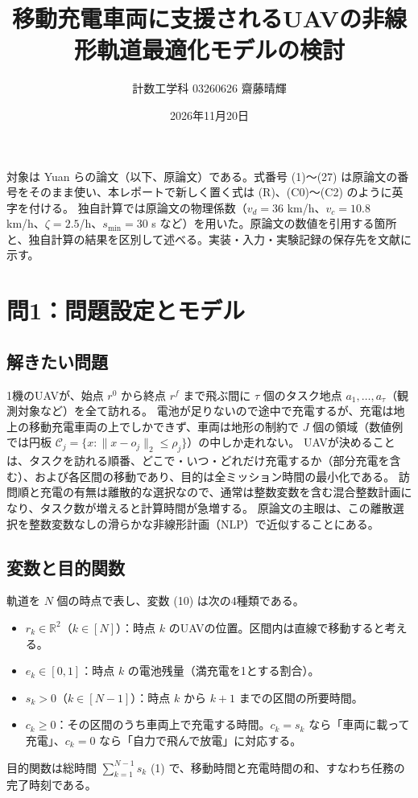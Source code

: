 \documentclass[uplatex,dvipdfmx,a4paper,11pt,jafont=haranoaji]{bxjsarticle}
\newcommand{\answerpart}[1]{\par\Needspace{6\baselineskip}\subsection*{#1}}
\newcommand{\norm}[1]{\lVert #1\rVert_2}
\begin{document}
\title{移動充電車両に支援されるUAVの非線形軌道最適化モデルの検討}
\author{計数工学科 03260626 齋藤晴輝}
\date{2026年11月20日}
\maketitle
\thispagestyle{fancy}

対象は Yuan ら\cite{yuan}の論文（以下、原論文）である。式番号 (1)〜(27) は原論文の番号をそのまま使い、本レポートで新しく置く式は (R)、(C0)〜(C2) のように英字を付ける。
独自計算では原論文の物理係数（$v_d=36$ km/h、$v_c=10.8$ km/h、$\zeta=2.5$/h、$s_{\min}=30$ s など）を用いた。原論文の数値を引用する箇所と、独自計算の結果を区別して述べる。実装・入力・実験記録の保存先を文献\cite{repo}に示す。

\section{問1：問題設定とモデル}

\answerpart{解きたい問題}
1機のUAVが、始点 $r^0$ から終点 $r^f$ まで飛ぶ間に $\tau$ 個のタスク地点 $a_1,\dots,a_\tau$（観測対象など）を全て訪れる。
電池が足りないので途中で充電するが、充電は地上の移動充電車両の上でしかできず、車両は地形の制約で $J$ 個の領域（数値例では円板 $\mathcal C_j=\{x:\norm{x-o_j}\le\rho_j\}$）の中しか走れない。
UAVが決めることは、タスクを訪れる順番、どこで・いつ・どれだけ充電するか（部分充電を含む）、および各区間の移動であり、目的は全ミッション時間の最小化である。
訪問順と充電の有無は離散的な選択なので、通常は整数変数を含む混合整数計画になり、タスク数が増えると計算時間が急増する。
原論文の主眼は、この離散選択を整数変数なしの滑らかな非線形計画（NLP）で近似することにある。

\answerpart{変数と目的関数}
軌道を $N$ 個の時点で表し、変数 (10) は次の4種類である。
\begin{itemize}
  \item $r_k\in\mathbb R^2$（$k\in[N]$）：時点 $k$ のUAVの位置。区間内は直線で移動すると考える。
  \item $e_k\in[0,1]$：時点 $k$ の電池残量（満充電を1とする割合）。
  \item $s_k>0$（$k\in[N-1]$）：時点 $k$ から $k+1$ までの区間の所要時間。
  \item $c_k\ge0$：その区間のうち車両上で充電する時間。$c_k=s_k$ なら「車両に載って充電」、$c_k=0$ なら「自力で飛んで放電」に対応する。
\end{itemize}
目的関数は総時間 $\sum_{k=1}^{N-1}s_k$ (1) で、移動時間と充電時間の和、すなわち任務の完了時刻である。
\end{document}
